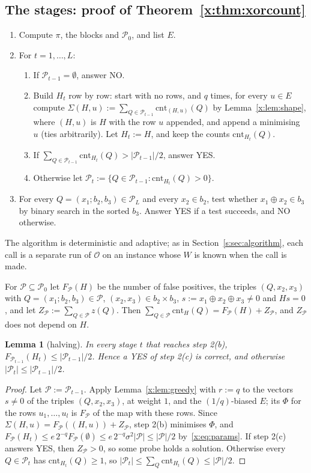 \documentclass[11pt]{article}
\newtheorem{lemma}[theorem]{Lemma}
\theoremstyle{definition}
\theoremstyle{remark}
\newcommand{\cnt}{\mathrm{cnt}}
\newcommand{\Pq}{\mathcal{P}}
\begin{document}
\subsection{The stages: proof of Theorem~\ref{x:thm:xorcount}}\label{x:sec:xorstages}

\begin{enumerate}[label=\arabic*.]
\item Compute $\pi$, the blocks and $\Pq_0$, and list $E$.
\item For $t=1,\dots,L$:
\begin{enumerate}[label=(\alph*)]
\item If $\Pq_{t-1}=\emptyset$, answer NO.
\item Build $H_t$ row by row: start with no rows, and $q$ times, for every $u\in E$ compute $\Sigma(H,u):=\sum_{Q\in\Pq_{t-1}}\cnt_{(H,u)}(Q)$ by Lemma~\ref{x:lem:shape}, where $(H,u)$ is $H$ with the row $u$ appended, and append a minimising $u$ (ties arbitrarily). Let $H_t:=H$, and keep the counts $\cnt_{H_t}(Q)$.
\item If $\sum_{Q\in\Pq_{t-1}}\cnt_{H_t}(Q)>|\Pq_{t-1}|/2$, answer YES.
\item Otherwise let $\Pq_t:=\{Q\in\Pq_{t-1}:\cnt_{H_t}(Q)>0\}$.
\end{enumerate}
\item For every $Q=(x_1;b_2,b_3)\in\Pq_L$ and every $x_2\in b_2$, test whether $x_1\oplus x_2\in b_3$ by binary search in the sorted $b_3$. Answer YES if a test succeeds, and NO otherwise.
\end{enumerate}
The algorithm is deterministic and adaptive; as in Section~\ref{s:sec:algorithm}, each call is a separate run of $\mathcal O$ on an instance whose $W$ is known when the call is made.

For $\Pq\subseteq\Pq_0$ let $F_\Pq(H)$ be the number of false positives, the triples $(Q,x_2,x_3)$ with $Q=(x_1;b_2,b_3)\in\Pq$, $(x_2,x_3)\in b_2\times b_3$, $s:=x_1\oplus x_2\oplus x_3\ne0$ and $Hs=0$, and let $Z_\Pq:=\sum_{Q\in\Pq}z(Q)$. Then $\sum_{Q\in\Pq}\cnt_H(Q)=F_\Pq(H)+Z_\Pq$, and $Z_\Pq$ does not depend on $H$.

\begin{lemma}[halving]\label{x:lem:halving}
In every stage $t$ that reaches step 2(b), $F_{\Pq_{t-1}}(H_t)\le|\Pq_{t-1}|/2$. Hence a YES of step 2(c) is correct, and otherwise $|\Pq_t|\le|\Pq_{t-1}|/2$.
\end{lemma}
\begin{proof}
Let $\Pq:=\Pq_{t-1}$. Apply Lemma~\ref{x:lem:greedy} with $r:=q$ to the vectors $s\ne0$ of the triples $(Q,x_2,x_3)$, at weight $1$, and the $(1/q)$-biased $E$; its $\Phi$ for the rows $u_1,\dots,u_l$ is $F_\Pq$ of the map with these rows. Since $\Sigma(H,u)=F_\Pq((H,u))+Z_\Pq$, step 2(b) minimises $\Phi$, and $F_\Pq(H_t)\le e\,2^{-q}F_\Pq(\emptyset)\le e\,2^{-q}\sigma^2|\Pq|\le|\Pq|/2$ by~\eqref{x:eq:params}. If step 2(c) answers YES, then $Z_\Pq>0$, so some probe holds a solution. Otherwise every $Q\in\Pq_t$ has $\cnt_{H_t}(Q)\ge1$, so $|\Pq_t|\le\sum_Q\cnt_{H_t}(Q)\le|\Pq|/2$.
\end{proof}
\end{document}
